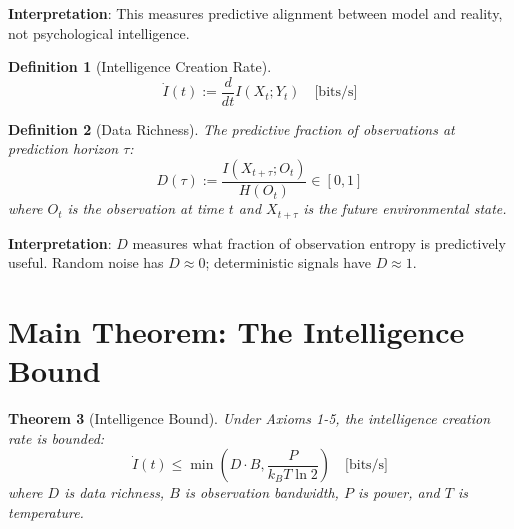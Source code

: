 \documentclass{article}
\newtheorem{theorem}{Theorem}[section]
\newtheorem{definition}[theorem]{Definition}
\begin{document}
\textbf{Interpretation}: This measures predictive alignment between model and reality, not psychological intelligence.

\begin{definition}[Intelligence Creation Rate]
\begin{equation}
\dot{I}(t) := \frac{d}{dt} I(X_t; Y_t) \quad \text{[bits/s]}
\end{equation}
\end{definition}

\begin{definition}[Data Richness]
The predictive fraction of observations at prediction horizon $\tau$:
\begin{equation}
D(\tau) := \frac{I(X_{t+\tau}; O_t)}{H(O_t)} \in [0, 1]
\end{equation}
where $O_t$ is the observation at time $t$ and $X_{t+\tau}$ is the future environmental state.
\end{definition}

\textbf{Interpretation}: $D$ measures what fraction of observation entropy is predictively useful. Random noise has $D \approx 0$; deterministic signals have $D \approx 1$.

\section{Main Theorem: The Intelligence Bound}

\begin{theorem}[Intelligence Bound]
\label{thm:main}
Under Axioms 1-5, the intelligence creation rate is bounded:
\begin{equation}
\dot{I}(t) \leq \min\left(D \cdot B, \frac{P}{k_B T \ln 2}\right) \quad \text{[bits/s]}
\end{equation}
where $D$ is data richness, $B$ is observation bandwidth, $P$ is power, and $T$ is temperature.
\end{theorem}
\end{document}
